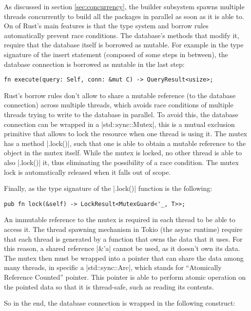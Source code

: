 As discussed in section \ref{sec:concurrency}, the builder
subsystem spawns multiple threads concurrently to build all
the packages in parallel as soon as it is able to. On of
Rust's main features is that the type system and borrow
rules automatically prevent race conditions. The database's
methods that modify it, require that the database itself is
borrowed as mutable. For example in the type signature of
the insert statement (composed of some steps in between),
the database connection is borrowed as mutable in the last
step:

\begin{verbatim}
fn execute(query: Self, conn: &mut C) -> QueryResult<usize>;
\end{verbatim}

Rust's borrow rules don't allow to share a mutable reference
(to the database connection) across multiple threads, which
avoids race conditions of multiple threads trying to write
to the database in parallel. To avoid this, the database
connection can be wrapped in a |std::sync::Mutex|, this is a
mutual exclusion primitive that allows to lock the resource
when one thread is using it. The mutex has a method
|.lock()|, such that one is able to obtain a mutable
reference to the object in the mutex itself. While the mutex
is locked, no other thread is able to also |.lock()| it,
thus eliminating the possibility of a race condition. The
mutex lock is automatically released when it falls out of
scope.

Finally, as the type signature of the |.lock()| function is
the following:

\begin{verbatim}
pub fn lock(&self) -> LockResult<MutexGuard<'_, T>>;
\end{verbatim}

An immutable reference to the mutex is required in each thread
to be able to access it. The thread spawning mechanism in
Tokio (the async runtime) require that each thread is
generated by a function that owns the data that it uses. For
this reason, a shared reference |&'a| cannot be used, as it
doesn't own its data. The mutex then must be wrapped into a
pointer that can share the data among many threads, in
specific a |std::sync::Arc|, which stands for ``Atomically
Reference Counted'' pointer. This pointer is able to perform
atomic operation on the pointed data so that it is
thread-safe, such as reading its contents.

So in the end, the database connection is wrapped in the
following construct:

